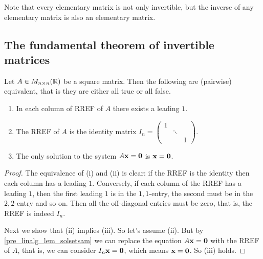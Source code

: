 \documentclass[10pt, a4paper]{article}
\begin{document}
\begin{remark}
    Note that every elementary matrix is not only invertible,
    but the inverse of any elementary matrix is also an elementary matrix.
\end{remark}

\subsection{The fundamental theorem of invertible matrices}
\begin{lemma}\label{linalg_lem_sqmatrrefcond}
    Let $A \in M_{n \times n}(\mathbb{R})$ be a square matrix.
    Then the following are (pairwise) equivalent,
    that is they are either all true or all false.
    \begin{enumerate}[label = (\roman*)]
        \item In each column of RREF of $A$ there exists a leading $1$.
        \item The RREF of $A$ is the identity matrix $I_n = \begin{pmatrix}
            1 & \phantom{} & \phantom{} \\
            \phantom{} & \ddots & \phantom{} \\
            \phantom{} & \phantom{} & 1
        \end{pmatrix}$.
        \item The only solution to the system $A\mathbf{x} = \mathbf{0}$ is $\mathbf{x} = \mathbf{0}$.
    \end{enumerate}
    \begin{proof}
        The equivalence of (i) and (ii) is clear:
        if the RREF is the identity then each column has a leading $1$.
        Conversely, if each column of the RREF has a leading $1$,
        then the first leading $1$ is in the $1, 1$-entry,
        the second must be in the $2, 2$-entry and so on.
        Then all the off-diagonal entries must be zero,
        that is, the RREF is indeed $I_n$.

        Next we show that (ii) implies (iii).
        So let's assume (ii).
        But by \autoref{pre_linalg_lem_solsetsam} we can replace the equation $A\mathbf{x} = \mathbf{0}$ with the RREF of $A$,
        that is, we can consider $I_n\mathbf{x} = \mathbf{0}$,
        which means $\mathbf{x} = \mathbf{0}$.
        So (iii) holds.


\end{proof}
\end{lemma}
\end{document}
